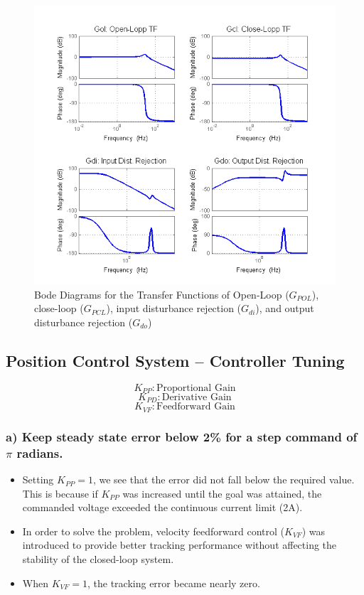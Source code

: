 \documentclass{article}
\theoremstyle{plain}
\theoremstyle{definition}
\theoremstyle{remark}
\begin{document}
\begin{figure}[htb]
\begin{center}
\includegraphics[width = 16 cm]{q3_16}
\caption{Bode Diagrams for the Transfer Functions of Open-Loop ($G_{POL}$), close-loop ($G_{PCL}$), input disturbance rejection ($G_{di}$), and output disturbance rejection ($G_{do}$) }
\label{q3_16}
\end{center}
\end{figure}

\clearpage

\subsection*{Position Control System – Controller Tuning}

$$K_{PP}: \text{Proportional Gain}$$
$$K_{PD}: \text{Derivative Gain}$$
$$K_{VF}: \text{Feedforward Gain}$$

\subsubsection*{a) Keep steady state error below 2\% for a step command of $\pi$ radians.}
\begin{itemize}
\item Setting $K_{PP}=1$, we see that the error did not fall below the required value. This is because if $K_{PP}$ was increased until the goal was attained, the commanded voltage exceeded the continuous current limit (2A).

\item In order to solve the problem, velocity feedforward control ($K_{VF}$) was introduced to provide better tracking performance without affecting the stability of the closed-loop system.

\item When $K_{VF} = 1$, the tracking error became nearly zero. 
\end{itemize}
\end{document}
